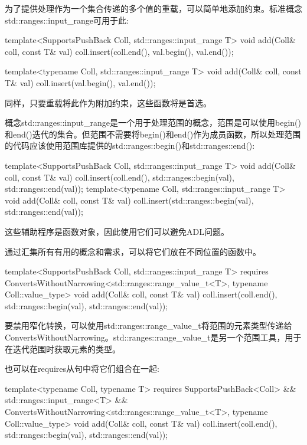 为了提供处理作为一个集合传递的多个值的重载，可以简单地添加约束。标准概念std::ranges::input\_range可用于此:

\begin{cpp}
template<SupportsPushBack Coll, std::ranges::input_range T>
void add(Coll& coll, const T& val)
{
	coll.insert(coll.end(), val.begin(), val.end());
}

template<typename Coll, std::ranges::input_range T>
void add(Coll& coll, const T& val)
{
	coll.insert(val.begin(), val.end());
}
\end{cpp}

同样，只要重载将此作为附加约束，这些函数将是首选。

概念std::ranges::input\_range是一个用于处理范围的概念，范围是可以使用begin()和end()迭代的集合。但范围不需要将begin()和end()作为成员函数，所以处理范围的代码应该使用范围库提供的std::ranges::begin()和std::ranges::end():

\begin{cpp}
template<SupportsPushBack Coll, std::ranges::input_range T>
void add(Coll& coll, const T& val)
{
	coll.insert(coll.end(), std::ranges::begin(val), std::ranges::end(val));
}
template<typename Coll, std::ranges::input_range T>
void add(Coll& coll, const T& val)
{
	coll.insert(std::ranges::begin(val), std::ranges::end(val));
}
\end{cpp}

这些辅助程序是函数对象，因此使用它们可以避免ADL问题。


通过汇集所有有用的概念和需求，可以将它们放在不同位置的函数中。

\begin{cpp}
template<SupportsPushBack Coll, std::ranges::input_range T>
requires ConvertsWithoutNarrowing<std::ranges::range_value_t<T>,
typename Coll::value_type>
void add(Coll& coll, const T& val)
{
	coll.insert(coll.end(),
				std::ranges::begin(val), std::ranges::end(val));
}
\end{cpp}

要禁用窄化转换，可以使用std::ranges::range\_value\_t将范围的元素类型传递给ConvertsWithoutNarrowing。std::ranges::range\_value\_t是另一个范围工具，用于在迭代范围时获取元素的类型。

也可以在requires从句中将它们组合在一起:

\begin{cpp}
template<typename Coll, typename T>
requires SupportsPushBack<Coll> &&
			std::ranges::input_range<T> &&
			ConvertsWithoutNarrowing<std::ranges::range_value_t<T>,
							typename Coll::value_type>
void add(Coll& coll, const T& val)
{
	coll.insert(coll.end(),
				std::ranges::begin(val), std::ranges::end(val));
}
\end{cpp}

